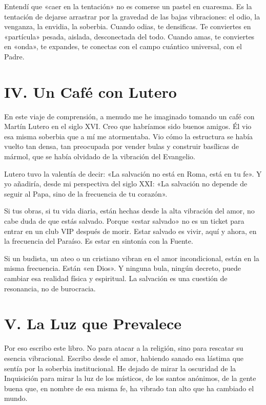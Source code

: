 Entendí que «caer en la tentación» no es comerse un pastel en cuaresma. Es la tentación de dejarse arrastrar por la gravedad de las bajas vibraciones: el odio, la venganza, la envidia, la soberbia. Cuando odias, te densificas. Te conviertes en «partícula» pesada, aislada, desconectada del todo. Cuando amas, te conviertes en «onda», te expandes, te conectas con el campo cuántico universal, con el Padre.

\section*{IV. Un Café con Lutero}

En este viaje de comprensión, a menudo me he imaginado tomando un café con Martín Lutero en el siglo XVI. Creo que habríamos sido buenos amigos. Él vio esa misma soberbia que a mí me atormentaba. Vio cómo la estructura se había vuelto tan densa, tan preocupada por vender bulas y construir basílicas de mármol, que se había olvidado de la vibración del Evangelio.

Lutero tuvo la valentía de decir: «La salvación no está en Roma, está en tu fe». Y yo añadiría, desde mi perspectiva del siglo XXI: «La salvación no depende de seguir al Papa, sino de la frecuencia de tu corazón».

Si tus obras, si tu vida diaria, están hechas desde la alta vibración del amor, no cabe duda de que estás salvado. Porque «estar salvado» no es un ticket para entrar en un club VIP después de morir. Estar salvado es vivir, aquí y ahora, en la frecuencia del Paraíso. Es estar en sintonía con la Fuente.

Si un budista, un ateo o un cristiano vibran en el amor incondicional, están en la misma frecuencia. Están «en Dios». Y ninguna bula, ningún decreto, puede cambiar esa realidad física y espiritual. La salvación es una cuestión de resonancia, no de burocracia.

\section*{V. La Luz que Prevalece}

Por eso escribo este libro. No para atacar a la religión, sino para rescatar su esencia vibracional. Escribo desde el amor, habiendo sanado esa lástima que sentía por la soberbia institucional. He dejado de mirar la oscuridad de la Inquisición para mirar la luz de los místicos, de los santos anónimos, de la gente buena que, en nombre de esa misma fe, ha vibrado tan alto que ha cambiado el mundo.

